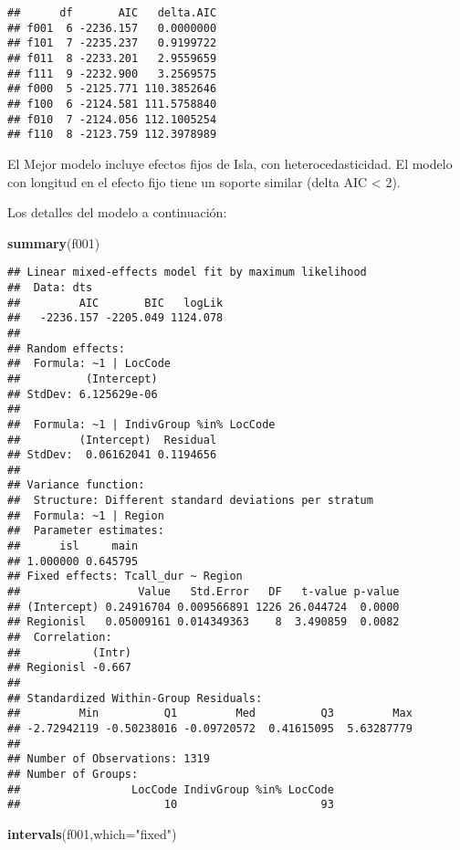 \documentclass[]{article}
\newenvironment{Shaded}{\begin{snugshade}}{\end{snugshade}}
\newcommand{\DataTypeTok}[1]{\textcolor[rgb]{0.13,0.29,0.53}{#1}}
\newcommand{\KeywordTok}[1]{\textcolor[rgb]{0.13,0.29,0.53}{\textbf{#1}}}
\newcommand{\NormalTok}[1]{#1}
\newcommand{\StringTok}[1]{\textcolor[rgb]{0.31,0.60,0.02}{#1}}
\begin{document}
\begin{verbatim}
##      df       AIC   delta.AIC
## f001  6 -2236.157   0.0000000
## f101  7 -2235.237   0.9199722
## f011  8 -2233.201   2.9559659
## f111  9 -2232.900   3.2569575
## f000  5 -2125.771 110.3852646
## f100  6 -2124.581 111.5758840
## f010  7 -2124.056 112.1005254
## f110  8 -2123.759 112.3978989
\end{verbatim}

El Mejor modelo incluye efectos fijos de Isla, con heterocedasticidad.
El modelo con longitud en el efecto fijo tiene un soporte similar (delta
AIC \textless{} 2).

Los detalles del modelo a continuación:

\begin{Shaded}
\begin{Highlighting}[]
\KeywordTok{summary}\NormalTok{(f001)}
\end{Highlighting}
\end{Shaded}

\begin{verbatim}
## Linear mixed-effects model fit by maximum likelihood
##  Data: dts 
##         AIC       BIC   logLik
##   -2236.157 -2205.049 1124.078
## 
## Random effects:
##  Formula: ~1 | LocCode
##          (Intercept)
## StdDev: 6.125629e-06
## 
##  Formula: ~1 | IndivGroup %in% LocCode
##         (Intercept)  Residual
## StdDev:  0.06162041 0.1194656
## 
## Variance function:
##  Structure: Different standard deviations per stratum
##  Formula: ~1 | Region 
##  Parameter estimates:
##      isl     main 
## 1.000000 0.645795 
## Fixed effects: Tcall_dur ~ Region 
##                  Value   Std.Error   DF   t-value p-value
## (Intercept) 0.24916704 0.009566891 1226 26.044724  0.0000
## Regionisl   0.05009161 0.014349363    8  3.490859  0.0082
##  Correlation: 
##           (Intr)
## Regionisl -0.667
## 
## Standardized Within-Group Residuals:
##         Min          Q1         Med          Q3         Max 
## -2.72942119 -0.50238016 -0.09720572  0.41615095  5.63287779 
## 
## Number of Observations: 1319
## Number of Groups: 
##                 LocCode IndivGroup %in% LocCode 
##                      10                      93
\end{verbatim}

\begin{Shaded}
\begin{Highlighting}[]
\KeywordTok{intervals}\NormalTok{(f001,}\DataTypeTok{which=}\StringTok{"fixed"}\NormalTok{)}
\end{Highlighting}
\end{Shaded}
\end{document}

